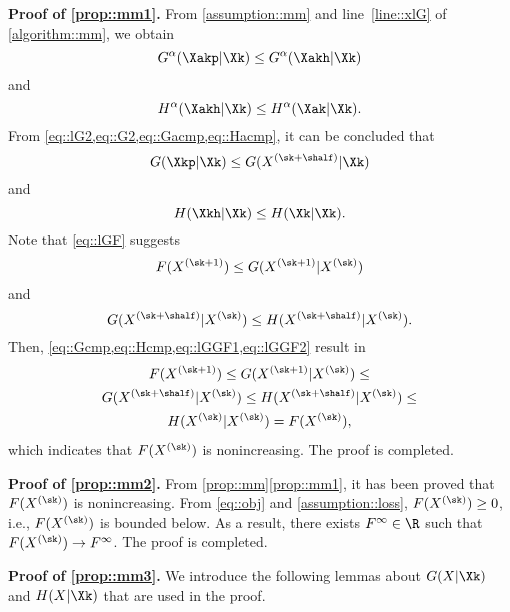 \noindent\textbf{Proof of \ref{prop::mm1}.\;} From \cref{assumption::mm} and line~\ref{line::xlG} of \cref{algorithm::mm}, we obtain
\begin{equation}\label{eq::Gacmp}
G^\alpha(\Xakp|\Xk) \leq G^\alpha(\Xakh|\Xk)
\end{equation}
and
\begin{equation}\label{eq::Hacmp}
H^\alpha(\Xakh|\Xk) \leq H^\alpha(\Xak|\Xk).
\end{equation}
From \cref{eq::lG2,eq::G2,eq::Gacmp,eq::Hacmp}, it can be concluded that
\begin{equation}\label{eq::Gcmp}
G(\Xkp|\Xk) \leq G(X^{(\sk+\shalf)}|\Xk)
\end{equation}
and
\begin{equation}\label{eq::Hcmp}
H(\Xkh|\Xk)\leq H(\Xk|\Xk).
\end{equation}
Note that \cref{eq::lGF} suggests
\begin{equation}\label{eq::lGGF1}
F(X^{(\sk+1)}) \leq G(X^{(\sk+1)}|X^{(\sk)})
\end{equation}
and
\begin{equation}\label{eq::lGGF2}
G(X^{(\sk+\shalf)}|X^{(\sk)}) \leq H(X^{(\sk+\shalf)}|X^{(\sk)}).
\end{equation}
Then, \cref{eq::Gcmp,eq::Hcmp,eq::lGGF1,eq::lGGF2} result in
\begin{multline}\label{eq::order}
F(X^{(\sk+1)}) \leq G(X^{(\sk+1)}|X^{(\sk)}) \leq\\
G(X^{(\sk+\shalf)}|X^{(\sk)}) \leq H(X^{(\sk+\shalf)}|X^{(\sk)})\leq \\
H(X^{(\sk)}|X^{(\sk)}) =  F(X^{(\sk)}),
\end{multline}
which indicates that $F(X^{(\sk)})$ is nonincreasing. The proof is completed.

\vspace{0.8em}
\noindent\textbf{Proof of \ref{prop::mm2}.\;} From \cref{prop::mm}\ref{prop::mm1}, it has been proved that $F(X^{(\sk)})$ is nonincreasing. From \cref{eq::obj} and \cref{assumption::loss}, $F(X^{(\sk)})\geq 0$, i.e., $F(X^{(\sk)})$ is bounded below. As a result, there exists $F^{\infty} \in \R $ such that $F(X^{(\sk)})\rightarrow F^{\infty}$. The proof is completed.

\vspace{0.8em}
\noindent\textbf{Proof of \ref{prop::mm3}.\;}
We introduce the following lemmas about $G(X|\Xk)$ and $H(X|\Xk)$ that are used in the proof.
 
